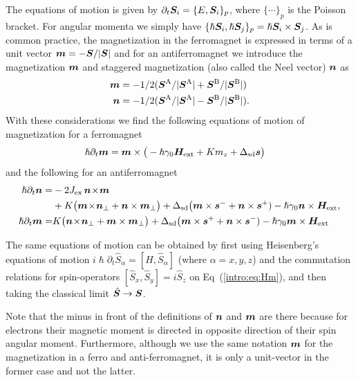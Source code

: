 The equations of motion is given by $\partial_t \boldsymbol{S}_i = \{E,\boldsymbol{S}_i\}_p$, where $\{\cdots\}_p$ is the Poisson bracket. For angular momenta we simply have $\{\hslash \boldsymbol{S}_i,\hslash \boldsymbol{S}_j\}_p=\hslash \boldsymbol{S}_i\times\boldsymbol{S}_j$. As is common practice, the magnetization in the ferromagnet is expressed in terms of a unit vector $\boldsymbol{m} = -\boldsymbol{S}/|\boldsymbol{S}|$ and for an antiferromagnet we introduce the magnetization $\boldsymbol{m}$ and staggered magnetization (also called the Neel vector) $\boldsymbol{n}$ as
\begin{align}
 	\boldsymbol{m}&=-1/2(\boldsymbol{S}^\text{A}/|\boldsymbol{S}^\text{A}|+\boldsymbol{S}^\text{B}/|\boldsymbol{S}^\text{B}|)\\
    \boldsymbol{n}&=-1/2(\boldsymbol{S}^\text{A}/|\boldsymbol{S}^\text{A}|-\boldsymbol{S}^\text{B}/|\boldsymbol{S}^\text{B}|).
\end{align} 
With these considerations we find the following equations of motion of magnetization for a ferromagnet
\begin{align}
	\hslash \partial_t \boldsymbol{m} &= \boldsymbol{m}\times\big(-\hslash\gamma_0\boldsymbol{H}_\text{ext}+Km_z+\Delta_\text{sd}\boldsymbol{s}\big)
	\label{intro:eq:S1}
\end{align}
and the following for an antiferromagnet
\begin{align}
\hslash \partial_t \boldsymbol{n} =& -2J_\text{ex}\, \boldsymbol{n}\!\times\!\boldsymbol{m} \nonumber\\
    & + K \big(\boldsymbol{m}\!\times\!\boldsymbol{n}_\perp+\boldsymbol{n}\times\boldsymbol{m}_\perp\big) 
	+ \Delta_\text{sd} \big(\boldsymbol{m}\times\boldsymbol{s}^-+\boldsymbol{n}\times\boldsymbol{s}^+) -\hslash\gamma_0\boldsymbol{n}\times\boldsymbol{H}_\text{ext},\\
\hslash \partial_t \boldsymbol{m} =&K  \big(\boldsymbol{n}\!\times\!\boldsymbol{n}_\perp+\boldsymbol{m}\times\boldsymbol{m}_\perp\big) 
	+ \Delta_\text{sd} \big(\boldsymbol{m}\times\boldsymbol{s}^++\boldsymbol{n}\times\boldsymbol{s}^-)-\hslash\gamma_0\boldsymbol{m}\times\boldsymbol{H}_\text{ext}
	\label{eq:sd:neel}
\end{align}

The same equations of motion can be obtained by first using Heisenberg's equations of motion $i \hslash\partial_t \hat{S}_\alpha = [H,\hat{S}_\alpha]$ (where $\alpha=x,y,z$) and the commutation relations for spin-operators $[\hat{S}_x, \hat{S}_y]=i\hat{S}_z$ on Eq~(\ref{intro:eq:Hm}), and then taking the classical limit $\hat{\boldsymbol{S}}\rightarrow \boldsymbol{S}$. 

Note that the minus in front of the definitions of $\boldsymbol{n}$ and $\boldsymbol{m}$ are there because for electrons their magnetic moment is directed in opposite direction of their spin angular moment. Furthermore, although we use the same notation $\boldsymbol{m}$ for the magnetization in a ferro and anti-ferromagnet, it is only a unit-vector in the former case and not the latter. 

